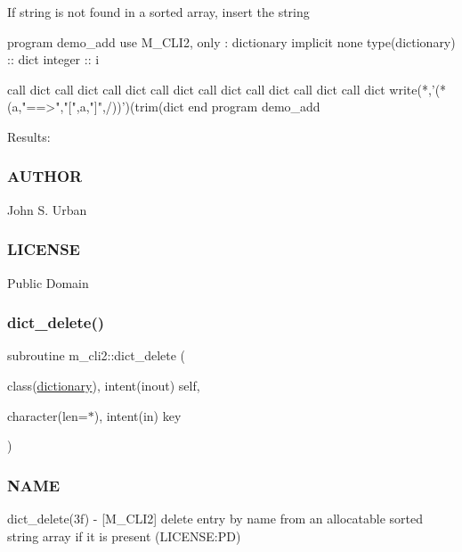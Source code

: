If string is not found in a sorted array, insert the string \begin{DoxyVerb}program demo_add
use M_CLI2, only : dictionary
implicit none
type(dictionary) :: dict
integer          :: i

call dict%
call dict%
call dict%
call dict%
call dict%
call dict%
call dict%
call dict%
write(*,'(*(a,"==>","[",a,"]",/))')(trim(dict%
end program demo_add
\end{DoxyVerb}


Results\+:

\subsubsection*{A\+U\+T\+H\+OR}

John S. Urban \subsubsection*{L\+I\+C\+E\+N\+SE}

Public Domain \mbox{\label{namespacem__cli2_afcdd2c59305faf341ebf8ec3b115a05e}} 
\subsubsection{\texorpdfstring{dict\+\_\+delete()}{dict\_delete()}}
{\footnotesize\ttfamily subroutine m\+\_\+cli2\+::dict\+\_\+delete (\begin{DoxyParamCaption}\item[{class(\mbox{\hyperlink{structm__cli2_1_1dictionary}{dictionary}}), intent(inout)}]{self,  }\item[{character(len=$\ast$), intent(in)}]{key }\end{DoxyParamCaption})\hspace{0.3cm}{\ttfamily [private]}}



\subsubsection*{N\+A\+ME}

dict\+\_\+delete(3f) -\/ \mbox{[}M\+\_\+\+C\+L\+I2\mbox{]} delete entry by name from an allocatable sorted string array if it is present (L\+I\+C\+E\+N\+SE\+:PD) 

